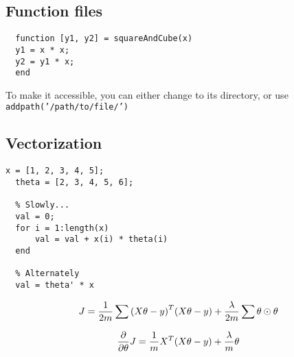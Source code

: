 \subsection{Function files}

\begin{lstlisting}[style=Matlab-editor]
  % In squareAndCube.m
  function [y1, y2] = squareAndCube(x)
  y1 = x * x;
  y2 = y1 * x;
  end
\end{lstlisting}

To make it accessible, you can either change to its directory,
or use \texttt{addpath('/path/to/file/')}

\subsection{Vectorization}

\begin{lstlisting}[style=Matlab-editor]
  x = [1, 2, 3, 4, 5];
  theta = [2, 3, 4, 5, 6];

  % Slowly...
  val = 0;
  for i = 1:length(x)
      val = val + x(i) * theta(i)
  end

  % Alternately
  val = theta' * x
\end{lstlisting}

\[
  J = \frac{1}{2m} \sum \qty( X\theta - y)^T \qty( X\theta - y)
      + \frac{\lambda}{2m} \sum \theta \odot \theta 
\]

\[
  \pdv{\theta} J = \frac{1}{m} X^T (X\theta - y)
                 + \frac{\lambda}{m} \theta
\]